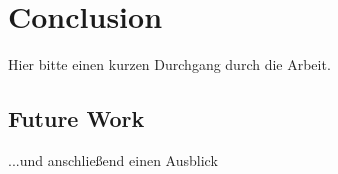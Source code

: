 
\chapter{Conclusion}\label{chap:conclusion}
Hier bitte einen kurzen Durchgang durch die Arbeit.

\section*{Future Work}
...und anschließend einen Ausblick

